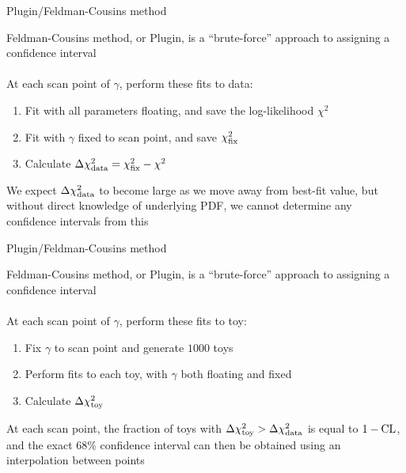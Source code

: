 \documentclass[xcolor={dvipsnames}]{beamer}
\begin{document}
\begin{frame}{Plugin/Feldman-Cousins method}
  \begin{center}
    {\Large Feldman-Cousins method, or Plugin, is a ``brute-force'' approach to assigning a confidence interval} \\~\\
    {At each scan point of $\gamma$, perform these fits to data:}
  \end{center}
  \begin{enumerate}
    \setlength\itemsep{0.5em}
    \item{Fit with all parameters floating, and save the log-likelihood $\chi^2$}
    \item{Fit with $\gamma$ fixed to scan point, and save $\chi^2_{\rm fix}$}
    \item{Calculate $\Delta\chi^2_{\rm data} = \chi^2_{\rm fix} - \chi^2$}
  \end{enumerate}
  \vspace{0.5cm}
  \begin{center}
    {We expect $\Delta\chi^2_{\rm data}$ to become large as we move away from best-fit value, but without direct knowledge of underlying PDF, we cannot determine any confidence intervals from this}
  \end{center}
\end{frame}

\begin{frame}{Plugin/Feldman-Cousins method}
  \begin{center}
    {\Large Feldman-Cousins method, or Plugin, is a ``brute-force'' approach to assigning a confidence interval} \\~\\
    {At each scan point of $\gamma$, perform these fits to toy:}
  \end{center}
  \begin{enumerate}
    \setlength\itemsep{0.5em}
    \item{Fix $\gamma$ to scan point and generate $1000$ toys}
    \item{Perform fits to each toy, with $\gamma$ both floating and fixed}
    \item{Calculate $\Delta\chi^2_{\rm toy}$}
  \end{enumerate}
  \vspace{0.42cm}
  \begin{center}
    {At each scan point, the fraction of toys with $\Delta\chi^2_{\rm toy} > \Delta\chi^2_{\rm data}$ is equal to $1 - \rm{CL}$, and the exact $68\%$ confidence interval can then be obtained using an interpolation between points}
  \end{center}
\end{frame}
\end{document}
